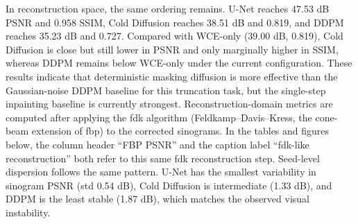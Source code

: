 In reconstruction space, the same ordering remains. U-Net reaches 47.53 dB PSNR and 0.958 SSIM, Cold Diffusion reaches 38.51 dB and 0.819, and DDPM reaches 35.23 dB and 0.727. Compared with WCE-only (39.00 dB, 0.819), Cold Diffusion is close but still lower in PSNR and only marginally higher in SSIM, whereas DDPM remains below WCE-only under the current configuration. These results indicate that deterministic masking diffusion is more effective than the Gaussian-noise DDPM baseline for this truncation task, but the single-step inpainting baseline is currently strongest.
Reconstruction-domain metrics are computed after applying the \gls{fdk} algorithm (Feldkamp--Davis--Kress, the cone-beam extension of \gls{fbp}) to the corrected sinograms. In the tables and figures below, the column header ``FBP PSNR'' and the caption label ``\gls{fdk}-like reconstruction'' both refer to this same \gls{fdk} reconstruction step.
Seed-level dispersion follows the same pattern. U-Net has the smallest variability in sinogram PSNR (std 0.54 dB), Cold Diffusion is intermediate (1.33 dB), and DDPM is the least stable (1.87 dB), which matches the observed visual instability.

\begin{table}[htbp]
\centering
\caption{Current baseline comparison (4 seeds $\times$ 4 cases, $k_c=320$). Values are reported as mean \(\pm\) std over seeds. Under the executed protocol, different seeds correspond to different sampled test subsets, so the standard deviation reflects both run-to-run and subset-composition variability.}
\label{tab:baseline_quantitative_current}
\end{table}

